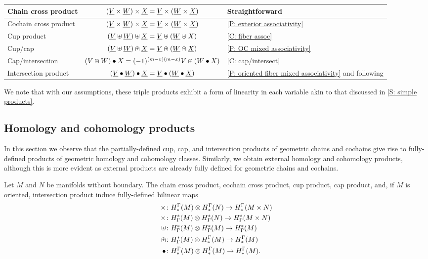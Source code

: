 \begin{center}
	\begin{tabular}{|l|c|l|}
		\hline
		Chain cross product& $(\underline{V} \times \underline{W}) \times \underline{X} = \underline{V} \times (\underline{W} \times \underline{X})$&Straightforward\\
		\hline
		Cochain cross product& $(\underline{V} \times \underline{W}) \times \underline{X} = \underline{V} \times (\underline{W} \times \underline{X})$&\cref{P: exterior associativity}\\
		\hline
		Cup product &$(\underline{V}\uplus \underline{W})\uplus\underline{X} = \underline{V}\uplus(\underline{W}\uplus X)$&\cref{C: fiber assoc} \\
		\hline
		Cup/cap & $(\underline{V} \uplus \underline{W})\nplus \underline{X} = \underline{V}\nplus(\underline{W}\nplus\underline{X})$& \cref{P: OC mixed associativity}\\
		\hline
		Cap/intersection &
		$ (\underline{V} \nplus \underline{W}) \bullet \underline{X} = (-1)^{(m-v)(m-x)}\underline{V} \nplus (\underline{W} \bullet \underline{X})$ &\cref{C: cap/intersect}\\
		\hline
		Intersection product &
		$(\underline{V}\bullet\underline{W})\bullet\underline{X} = \underline{V}\bullet(\underline{W}\bullet \underline{X})$&\cref{P: oriented fiber mixed associativity} and following\\
		\hline
	\end{tabular}
\end{center}

We note that with our assumptions, these triple products exhibit a form of linearity in each variable akin to that discussed in \cref{S: simple products}.

\subsection{Homology and cohomology products}\label{S: homology products}

In this section we observe that the partially-defined cup, cap, and intersection products of geometric chains and cochains give rise to fully-defined products of geometric homology and cohomology classes.
Similarly, we obtain external homology and cohomology products, although this is more evident as external products are already fully defined for geometric chains and cochains.

\begin{theorem}\label{T: (co)homology products}
	Let $M$ and $N$ be manifolds without boundary.
	The chain cross product, cochain cross product, cup product, cap product, and, if $M$ is oriented, intersection product induce fully-defined bilinear maps
	\begin{align*}
		\times \colon & H^\Gamma_*(M) \otimes H^\Gamma_*(N) \to H^\Gamma_*(M \times N)\\
		\times \colon & H_\Gamma^*(M) \otimes H_\Gamma^*(N) \to H_\Gamma^*(M \times N)\\
		\uplus \colon & H_\Gamma^*(M) \otimes H_\Gamma^*(M) \to H_\Gamma^*(M)\\
		\nplus \colon & H_\Gamma^*(M) \otimes H^\Gamma_*(M) \to H^\Gamma_*(M)\\
		\bullet \colon & H^\Gamma_*(M) \otimes H^\Gamma_*(M) \to H^\Gamma_*(M).\\
	\end{align*}
\end{theorem}

